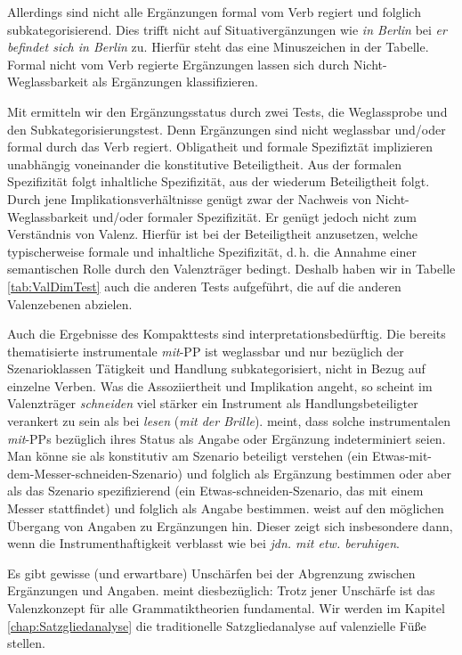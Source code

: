 Allerdings sind nicht alle Ergänzungen formal vom Verb regiert und folglich subkategorisierend. Dies trifft nicht auf Situativergänzungen wie \textit{in Berlin} bei \textit{er befindet sich in Berlin} zu. Hierfür steht das eine Minuszeichen in der Tabelle. Formal nicht vom Verb regierte Ergänzungen lassen sich durch Nicht-Weglassbarkeit als Ergänzungen klassifizieren.

Mit \citet[71]{Jacobs1994} ermitteln wir den Ergänzungsstatus durch zwei Tests, die Weglassprobe und den Subkategorisierungstest. Denn Ergänzungen sind nicht weglassbar und/oder formal durch das Verb regiert. Obligatheit und formale Spezifiztät implizieren unabhängig voneinander die konstitutive Beteiligtheit. Aus der formalen Spezifizität folgt inhaltliche Spezifizität, aus der wiederum Beteiligtheit folgt. Durch jene Implikationsverhältnisse genügt zwar der Nachweis von Nicht-Weglassbarkeit und/oder formaler Spezifizität. Er genügt jedoch nicht zum Verständnis von Valenz. Hierfür ist bei der Beteiligtheit anzusetzen, welche typischerweise formale und inhaltliche Spezifizität, d.\,h. die Annahme einer semantischen Rolle durch den Valenzträger bedingt. Deshalb haben wir in Tabelle \ref{tab:ValDimTest} auch die anderen Tests aufgeführt, die auf die anderen Valenzebenen abzielen. 
    
Auch die Ergebnisse des Kompakttests sind interpretationsbedürftig. Die bereits thematisierte instrumentale \textit{mit}-PP ist weglassbar und nur bezüglich der Szenarioklassen Tätigkeit und Handlung subkategorisiert, nicht in Bezug auf einzelne Verben. Was die Assoziiertheit und Implikation angeht, so scheint im Valenzträger \textit{schneiden} viel stärker ein Instrument als Handlungsbeteiligter verankert zu sein als bei \textit{lesen} (\textit{mit der Brille}). \citet[117]{Fischer2013} meint, dass solche instrumentalen \textit{mit}-PPs bezüglich ihres Status als Angabe oder Ergänzung indeterminiert seien. Man könne sie als konstitutiv am Szenario beteiligt verstehen (ein Etwas-mit-dem-Messer-schneiden-Szenario) und folglich als Ergänzung bestimmen oder aber als das Szenario spezifizierend (ein Etwas-schneiden-Szenario, das mit einem Messer stattfindet) und folglich als Angabe bestimmen. \citet[99]{Welke2011} weist auf den möglichen Übergang von Angaben zu Ergänzungen hin. Dieser zeigt sich insbesondere dann, wenn die Instrumenthaftigkeit verblasst wie bei \textit{jdn. mit etw. beruhigen}. 

Es gibt gewisse (und erwartbare) Unschärfen bei der Abgrenzung zwischen Ergänzungen und Angaben. \citet[328]{Eisenberg2020_Satz} meint diesbezüglich:  Trotz jener Unschärfe ist das Valenzkonzept für alle Grammatiktheorien fundamental. Wir werden im Kapitel \ref{chap:Satzgliedanalyse} die traditionelle Satzgliedanalyse auf valenzielle Füße stellen. 


